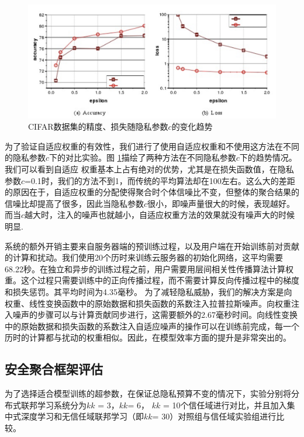 \begin{figure}[!hbt]
\centering
  	\includegraphics[scale=0.6]{fig2/C5/cifar实验}%
	\caption{CIFAR数据集的精度、损失随隐私参数$c$的变化趋势}
  	\label{fig:CIFAR数据集的精度、损失随参数$c$的变化趋势} 
\end{figure}

为了验证自适应权重的有效性，我们进行了使用自适应权重和不使用这方法在不同的隐私参数$c$下的对比实验。图 \ref{fig:CIFAR数据集的精度、损失随参数$c$的变化趋势}描绘了两种方法在不同隐私参数$c$下的趋势情况。我们可以看到自适应
权重基本上占有绝对的优势，尤其是在损失函数值，在隐私参数$c$=0.1时，我们的方法不到1，而传统的平均算法却在100左右。这么大的差距的原因在于，自适应权重的分配使得聚合时个体信噪比不变，但整体的聚合结果的信噪比却提高了很多，因此当隐私参数$c$很小，即噪声量很大的时候，表现越好。而当$c$越大时，注入的噪声也就越小，自适应权重方法的效果就没有噪声大的时候明显.

系统的额外开销主要来自服务器端的预训练过程，以及用户端在开始训练前对贡献的计算和扰动。我们使用20个历时来训练云服务器的初始化网络，这平均需要68.22秒。在独立和异步的训练过程之前，用户需要用层间相关性传播算法计算权重。这个过程只需要训练中的正向传播过程，而不需要计算反向传播过程中的梯度和损失惩罚。其平均时间为4.35毫秒。
为了减轻隐私威胁，我们的解决方案是向权重、线性变换函数中的原始数据和损失函数的系数注入拉普拉斯噪声。向权重注入噪声的步骤可以与计算贡献同步进行，这需要额外的2.67毫秒时间。向线性变换中的原始数据和损失函数的系数注入自适应噪声的操作可以在训练前完成，每一个历时的计算都与扰动的权重相似。因此，在模型效率方面的提升是非常突出的。

\subsection{安全聚合框架评估}
为了选择适合模型训练的超参数，在保证总隐私预算不变的情况下，实验分别将分布式联邦学习系统分为$k k$ = 3，$k k$= 6， $k k$ = 10个信任域进行对比，并且加入集中式深度学习和无信任域联邦学习（即$k k$= 30）对照组与信任域实验组进行比较。 

